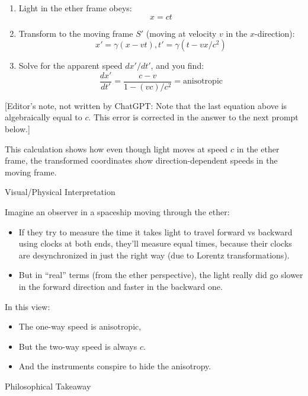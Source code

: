 \documentclass[a4paper]{article}
\theoremstyle{plain}
\theoremstyle{definition}
\begin{document}
\begin{enumerate}

\item Light in the ether frame obeys:
\begin{equation}
x = ct
\end{equation}

\item Transform to the moving frame $S'$ (moving at velocity $v$ in
  the $x$-direction):
\begin{equation}
x' = \gamma(x-vt), t' = \gamma(t-vx/c^2)
\end{equation}

\item Solve for the apparent speed $dx'/dt'$, and you find:
\begin{equation}
\frac{dx'}{dt'} = \frac{c-v}{1-(vc)/c^2} = \text{anisotropic}
\end{equation}
\end{enumerate}

[Editor's note, not written by ChatGPT: Note that the last equation
above is algebraically equal to $c$.  This error is corrected in the
answer to the next prompt below.]

This calculation shows how even though light moves at speed $c$ in the
ether frame, the transformed coordinates show direction-dependent
speeds in the moving frame.

Visual/Physical Interpretation

Imagine an observer in a spaceship moving through the ether:
\begin{itemize}
\item If they try to measure the time it takes light to travel forward
  vs backward using clocks at both ends, they'll measure equal times,
  because their clocks are desynchronized in just the right way (due
  to Lorentz transformations).
\item But in ``real'' terms (from the ether perspective), the light
  really did go slower in the forward direction and faster in the
  backward one.
\end{itemize}
In this view:
\begin{itemize}
\item The one-way speed is anisotropic,
\item But the two-way speed is always $c$.
\item And the instruments conspire to hide the anisotropy.
\end{itemize}

Philosophical Takeaway
\end{document}
